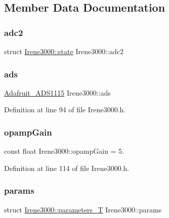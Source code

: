 \subsection{Member Data Documentation}
\mbox{\label{class_irene3000_aae3a95a1c83c766cd2f299ce471c337e}} 
\subsubsection{\texorpdfstring{adc2}{adc2}}
{\footnotesize\ttfamily struct \hyperlink{struct_irene3000_1_1state}{Irene3000\+::state} Irene3000\+::adc2\hspace{0.3cm}{\ttfamily [private]}}

\mbox{\label{class_irene3000_a1215e77ba761c9908d80d691f149e135}} 
\subsubsection{\texorpdfstring{ads}{ads}}
{\footnotesize\ttfamily \hyperlink{class_adafruit___a_d_s1115}{Adafruit\+\_\+\+A\+D\+S1115} Irene3000\+::ads\hspace{0.3cm}{\ttfamily [private]}}



Definition at line 94 of file Irene3000.\+h.

\mbox{\label{class_irene3000_a4e588985ca74e5076029d5dee81034f2}} 
\subsubsection{\texorpdfstring{opamp\+Gain}{opampGain}}
{\footnotesize\ttfamily const float Irene3000\+::opamp\+Gain = 5.\hspace{0.3cm}{\ttfamily [private]}}



Definition at line 114 of file Irene3000.\+h.

\mbox{\label{class_irene3000_a136585a5ee7f9ac6ab52175fa153f8e3}} 
\subsubsection{\texorpdfstring{params}{params}}
{\footnotesize\ttfamily struct \hyperlink{struct_irene3000_1_1parameters___t}{Irene3000\+::parameters\+\_\+T} Irene3000\+::params\hspace{0.3cm}{\ttfamily [private]}}

